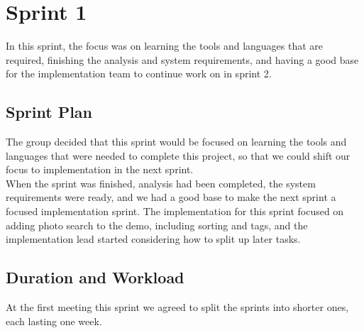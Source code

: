 \chapter{Sprint 1}
\label{chap:S1}
In this sprint, the focus was on learning the tools and languages that are required, finishing the analysis and system requirements, and having a good base for the implementation team to continue work on in sprint 2.

\section{Sprint Plan}
\label{sec:S1Planning}
The group decided that this sprint would be focused on learning the tools and languages that were needed to complete this project, so that we could shift our focus to implementation in the next sprint. \\
\indent When the sprint was finished, analysis had been completed, the system requirements were ready, and we had a good base to make the next sprint a focused implementation sprint. The implementation for this sprint focused on adding photo search to the demo, including sorting and tags, and the implementation lead started considering how to split up later tasks.

\section{Duration and Workload}
\label{sec:S1DurationWorkload}
At the first meeting this sprint we agreed to split the sprints into shorter ones, each lasting one week. \\

